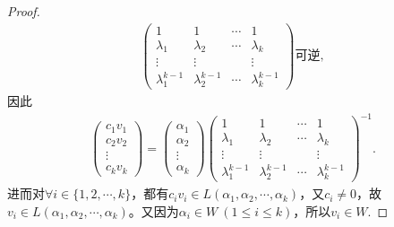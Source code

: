 \documentclass[../../main.tex]{subfiles}
\begin{document}
\begin{proof}
\begin{align*}
\begin{pmatrix}
1 & 1 & \cdots & 1 \\
\lambda_1 & \lambda_2 & \cdots & \lambda_k \\
\vdots & \vdots & & \vdots \\
\lambda_1^{k - 1} & \lambda_2^{k - 1} & \cdots & \lambda_k^{k - 1}
\end{pmatrix} \text{可逆},
\end{align*}
因此
\begin{align*}
\begin{pmatrix}
c_1v_1 \\
c_2v_2 \\
\vdots \\
c_kv_k
\end{pmatrix} = 
\begin{pmatrix}
\alpha_1 \\
\alpha_2 \\
\vdots \\
\alpha_k
\end{pmatrix} 
\begin{pmatrix}
1 & 1 & \cdots & 1 \\
\lambda_1 & \lambda_2 & \cdots & \lambda_k \\
\vdots & \vdots & & \vdots \\
\lambda_1^{k - 1} & \lambda_2^{k - 1} & \cdots & \lambda_k^{k - 1}
\end{pmatrix}^{-1}.
\end{align*}
进而对$\forall i\in \{1,2,\cdots,k\}$，都有$c_iv_i\in L(\alpha_1,\alpha_2,\cdots,\alpha_k)$，又$c_i\ne 0$，故$v_i\in L(\alpha_1,\alpha_2,\cdots,\alpha_k)$。又因为$\alpha_i\in W\ (1\le i\le k)$，所以$v_i\in W$.

\end{proof}
\end{document}
